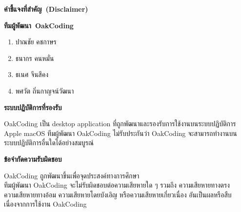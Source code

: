 \begin{titlepage}
\maketitle
\thispagestyle{empty}
\vspace{1ex}


\mbox{\LARGE \textbf{คำชี้แจงที่สำคัญ (Disclaimer)}}

\rule{0em}{3ex}

\mbox{\large \textbf{ทีมผู้พัฒนา OakCoding}}

\begin{enumerate}[topsep = 0pt, itemsep = 0.6pt]
    \item ปาณชัย คชกาษร
    \item ธนากร คนหมั่น
    \item ธเนศ จีนสีคง
    \item พศวัต ถิ่นกาญจน์วัฒนา
\end{enumerate}

\rule{0em}{3ex}

\mbox{\large \textbf{ระบบปฏิบัติการที่รองรับ}}

OakCoding เป็น desktop application ที่ถูกพัฒนาและรองรับการใช้งานบนระบบปฏิบัติการ Apple macOS
ทีมผู้พัฒนา OakCoding ไม่รับประกันว่า OakCoding จะสามารถทำงานบนระบบปฏิบัติการอื่นใดได้อย่างสมบูรณ์

\rule{0em}{3ex}

\mbox{\large \textbf{ข้อจำกัดความรับผิดชอบ}}

OakCoding ถูกพัฒนาขึ้นเพื่อจุดประสงค์ทางการศึกษา\\
ทีมผู้พัฒนา OakCoding จะไม่รับผิดชอบต่อความเสียหายใด ๆ รวมถึง ความเสียหายทางตรง\\
ความเสียหายทางอ้อม ความเสียหายโดยบังเอิญ หรือความเสียหายเกี่ยวเนื่อง อันเป็นผลหรือสืบเนื่องจากการใช้งาน OakCoding
\end{titlepage}
